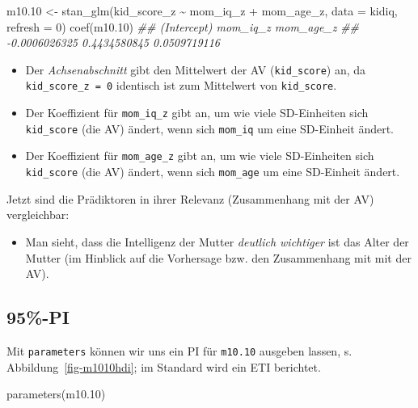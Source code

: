 \documentclass[
  a4paper,
  DIV=11]{scrreprt}
\newenvironment{Shaded}{\begin{snugshade}}{\end{snugshade}}
\newcommand{\AttributeTok}[1]{\textcolor[rgb]{0.40,0.45,0.13}{#1}}
\newcommand{\DecValTok}[1]{\textcolor[rgb]{0.68,0.00,0.00}{#1}}
\newcommand{\DocumentationTok}[1]{\textcolor[rgb]{0.37,0.37,0.37}{\textit{#1}}}
\newcommand{\FloatTok}[1]{\textcolor[rgb]{0.68,0.00,0.00}{#1}}
\newcommand{\FunctionTok}[1]{\textcolor[rgb]{0.28,0.35,0.67}{#1}}
\newcommand{\NormalTok}[1]{\textcolor[rgb]{0.00,0.23,0.31}{#1}}
\newcommand{\OtherTok}[1]{\textcolor[rgb]{0.00,0.23,0.31}{#1}}
\newcommand{\SpecialCharTok}[1]{\textcolor[rgb]{0.37,0.37,0.37}{#1}}
\providecommand{\tightlist}{%
  \setlength{\itemsep}{0pt}\setlength{\parskip}{0pt}}\usepackage{longtable,booktabs,array}
\theoremstyle{definition}
\theoremstyle{remark}
\begin{document}
\begin{Shaded}
\begin{Highlighting}[]
\NormalTok{m10}\FloatTok{.10} \OtherTok{\textless{}{-}} \FunctionTok{stan\_glm}\NormalTok{(kid\_score\_z }\SpecialCharTok{\textasciitilde{}}\NormalTok{ mom\_iq\_z }\SpecialCharTok{+}\NormalTok{ mom\_age\_z, }
                   \AttributeTok{data =}\NormalTok{ kidiq, }
                   \AttributeTok{refresh =} \DecValTok{0}\NormalTok{)}
\FunctionTok{coef}\NormalTok{(m10}\FloatTok{.10}\NormalTok{)}
\DocumentationTok{\#\#   (Intercept)      mom\_iq\_z     mom\_age\_z }
\DocumentationTok{\#\# {-}0.0006026325  0.4434580845  0.0509719116}
\end{Highlighting}
\end{Shaded}

\begin{itemize}
\tightlist
\item
  Der \emph{Achsenabschnitt} gibt den Mittelwert der AV
  (\texttt{kid\_score}) an, da \texttt{kid\_score\_z\ =\ 0} identisch
  ist zum Mittelwert von \texttt{kid\_score}.
\item
  Der Koeffizient für \texttt{mom\_iq\_z} gibt an, um wie viele
  SD-Einheiten sich \texttt{kid\_score} (die AV) ändert, wenn sich
  \texttt{mom\_iq} um eine SD-Einheit ändert.
\item
  Der Koeffizient für \texttt{mom\_age\_z} gibt an, um wie viele
  SD-Einheiten sich \texttt{kid\_score} (die AV) ändert, wenn sich
  \texttt{mom\_age} um eine SD-Einheit ändert.
\end{itemize}

Jetzt sind die Prädiktoren in ihrer Relevanz (Zusammenhang mit der AV)
vergleichbar:

\begin{itemize}
\tightlist
\item
  Man sieht, dass die Intelligenz der Mutter \emph{deutlich wichtiger}
  ist das Alter der Mutter (im Hinblick auf die Vorhersage bzw. den
  Zusammenhang mit mit der AV).
\end{itemize}

\hypertarget{pi}{%
\subsection{95\%-PI}\label{pi}}

Mit \texttt{parameters} können wir uns ein PI für \texttt{m10.10}
ausgeben lassen, s. Abbildung~\ref{fig-m1010hdi}; im Standard wird ein
ETI berichtet.

\begin{Shaded}
\begin{Highlighting}[]
\FunctionTok{parameters}\NormalTok{(m10}\FloatTok{.10}\NormalTok{) }
\end{Highlighting}
\end{Shaded}
\end{document}

